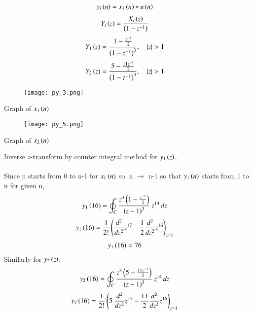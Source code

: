 \documentclass[beamer]{IEEEtran}
\theoremstyle{remark}
\begin{document}
\begin{align}
y_i\left(n\right)&=x_1\left(n\right)*u\left(n\right)
\end{align}
\begin{align}
\label{w1}
Y_i\left(z\right)&=\frac{X_i\left(z\right)}{\left(1-z^{-1}\right)}
\end{align}
\begin{align}
Y_1\brak{z}&=\frac{1-\frac{z^{-1}}{2}}{\brak{1-z^{-1}}^3},\quad |z|>1
\end{align}
\begin{align}Y_2\brak{z}&=\frac{5-\frac{11z^{-1}}{2}}{\brak{1-z^{-1}}^3},\quad |z|>1\end{align}
\begin{figure}[h]
    \centering
    \texttt{[image: py\_3.png]}
    \label{fig:x1n}
\end{figure}
\begin{center}
    Graph of $x_1\left(n\right)$
\end{center}
\begin{figure}[h]
    \centering
    \texttt{[image: py\_5.png]}
    \label{fig:x2n}
\end{figure}
\begin{center}
    Graph of $x_2\left(n\right)$\\[20ex]
\end{center}
Inverse $z$-transform by counter integral method for  $y_1\left(z\right)$,\\\\Since n starts from 0 to n-1 for $x_1\left(n\right)$ so, n $\to$ n-1 so that $y_1\left(n\right)$ starts from 1 to n for given n,\\
\begin{align}
y_1\left(16\right)&=\oint_C \frac{z^3\left(1-\frac{z^{-1}}{2}\right)}{\left(z-1\right)^3}\ z^{14}\, dz
\end{align}
\begin{align}
y_1\left(16\right)&=\frac{1}{2!}\left(\frac{d^2}{dz^2}z^{17}-\frac{1}{2}\frac{d^2}{dz^2}z^{16}\right)_{z=1}  
\end{align}
\begin{align}
y_1\left(16\right)&=76
\end{align}
Similarly for $y_2\left(z\right)$,
\begin{align}
y_2\left(16\right)&=\oint_C \frac{z^3\left(5-\frac{11z^{-1}}{2}\right)}{\left(z-1\right)^3}\ z^{14}\, dz
\end{align}
\begin{align}
y_2\brak{16}&=\frac{1}{2!}\brak{5\ \frac{d^2}{dz^2}z^{17}-\frac{11}{2}\frac{d^2}{dz^2}z^{16}}_{z=1}  
\end{align}
\end{document}
